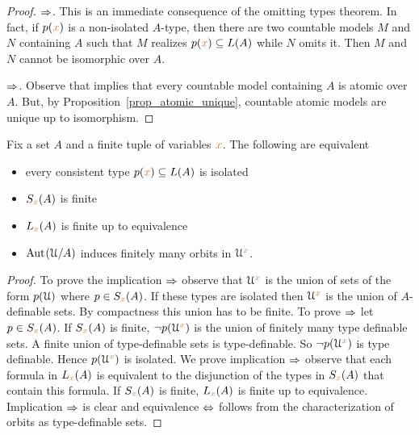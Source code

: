 \vspace*{-\parskip}
\begin{proof} $\Rightarrow$. This is an immediate consequence of the omitting types theorem.
In fact, if $p({\color{brown} x})$ is a non-isolated $A$-type, then there are two countable models $M$ and $N$ containing $A$ such that $M$ realizes $p({\color{brown} x})\subseteq L(A)$ while $N$ omits it.
Then $M$ and $N$ cannot be isomorphic over $A$.

$\Rightarrow$. Observe that  implies that every countable model containing $A$ is atomic over $A$.
But, by Proposition~\ref{prop_atomic_unique}, countable atomic models are unique up to isomorphism.
\end{proof}

\begin{proposition}\label{prop_ERNS_equivalents}
Fix a set $A$ and a finite tuple of variables ${\color{brown} x}$.
The following are equivalent\nobreak
\begin{itemize}   
\item[1.] every consistent type $p({\color{brown} x})\subseteq L(A)$ is isolated
\item[2.] $S_{\color{brown} x}(A)$ is finite
\item[3.] $L_{\color{brown} x}(A)$ is finite up to equivalence
\item[4.] ${\rm Aut\kern.15ex}(\EuScript U/A)$ induces finitely many orbits in $\EuScript U^{\color{brown} x}$.
\end{itemize}
\end{proposition}
\begin{proof}To prove the implication $\Rightarrow$ observe that $\EuScript U^{\color{brown} x}$ is the union of sets of the form $p(\EuScript U)$ where $p\in S_{\color{brown} x}(A)$.
If these types are isolated then $\EuScript U^{\color{brown} x}$ is the union of $A$-definable sets.
By compactness this union has to be finite.
To prove $\Rightarrow$ let $p\in S_{\color{brown} x}(A)$.
If $S_{\color{brown} x}(A)$ is finite, $\neg p(\EuScript U^{\color{brown} x})$ is the union of finitely many type definable sets.
A finite union of type-definable sets is type-definable.
So $\neg p(\EuScript U^{\color{brown} x})$ is type definable.
Hence $p(\EuScript U^{\color{brown} x})$ is isolated.
We prove implication $\Rightarrow$ observe that each formula in $L_{\color{brown} x}(A)$ is equivalent to the disjunction of the types in $S_{\color{brown} x}(A)$ that contain this formula.
If $S_{\color{brown} x}(A)$ is finite, $L_{\color{brown} x}(A)$ is finite up to equivalence.
Implication $\Rightarrow$ is clear and equivalence $\Leftrightarrow$ follows from the characterization of orbits as type-definable sets.
\end{proof}

